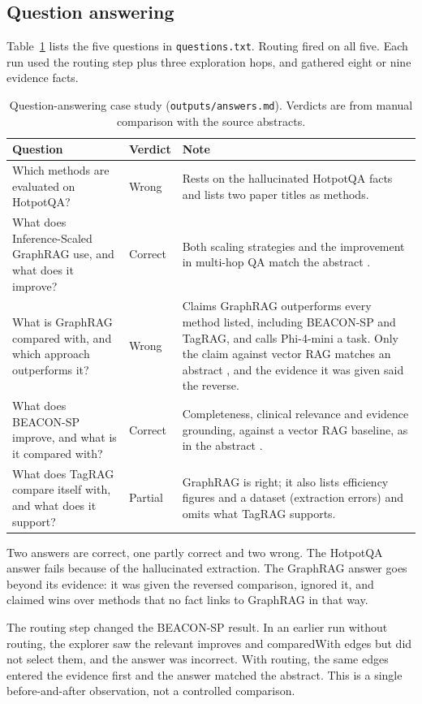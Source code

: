 \documentclass[11pt]{article}
\newcommand{\code}[1]{\texttt{#1}}
\newcommand{\prop}[1]{\textsf{#1}}
\begin{document}
\subsection{Question answering}
Table~\ref{tab:qa} lists the five questions in \code{questions.txt}. Routing fired on all five. Each run used the routing step plus three exploration hops, and gathered eight or nine evidence facts.

\begin{table}[t]
\centering\small
\begin{tabularx}{\linewidth}{>{\raggedright\arraybackslash}p{4.4cm} l X}
\toprule
Question & Verdict & Note \\
\midrule
Which methods are evaluated on HotpotQA? & Wrong & Rests on the hallucinated HotpotQA facts and lists two paper titles as methods. \\
What does Inference-Scaled GraphRAG use, and what does it improve? & Correct & Both scaling strategies and the improvement in multi-hop QA match the abstract \cite{thompson2025isgraphrag}. \\
What is GraphRAG compared with, and which approach outperforms it? & Wrong & Claims GraphRAG outperforms every method listed, including BEACON-SP and TagRAG, and calls Phi-4-mini a task. Only the claim against vector RAG matches an abstract \cite{ahmad2025oran}, and the evidence it was given said the reverse. \\
What does BEACON-SP improve, and what is it compared with? & Correct & Completeness, clinical relevance and evidence grounding, against a vector RAG baseline, as in the abstract \cite{davaslioglu2026beacon}. \\
What does TagRAG compare itself with, and what does it support? & Partial & GraphRAG is right; it also lists efficiency figures and a dataset (extraction errors) and omits what TagRAG supports. \\
\bottomrule
\end{tabularx}
\caption{Question-answering case study (\code{outputs/answers.md}). Verdicts are from manual comparison with the source abstracts.}
\label{tab:qa}
\end{table}

Two answers are correct, one partly correct and two wrong. The HotpotQA answer fails because of the hallucinated extraction. The GraphRAG answer goes beyond its evidence: it was given the reversed comparison, ignored it, and claimed wins over methods that no fact links to GraphRAG in that way.

The routing step changed the BEACON-SP result. In an earlier run without routing, the explorer saw the relevant \prop{improves} and \prop{comparedWith} edges but did not select them, and the answer was incorrect. With routing, the same edges entered the evidence first and the answer matched the abstract. This is a single before-and-after observation, not a controlled comparison.
\end{document}

